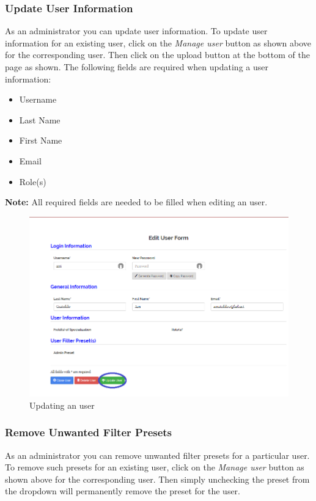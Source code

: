 \documentclass[fontsize=12pt,paper=letter,twoside]{scrartcl}
\begin{document}
\clearpage
\subsubsection{Update User Information}
As an administrator you can update user information. To update user information for an existing user, click on the \emph{Manage user} button as shown above for the corresponding user. Then click on the upload button at the bottom of the page as shown. The following fields are required when updating a user information:
\begin{itemize}
\item Username
\item Last Name
\item First Name
\item Email
\item Role(s)
\end{itemize}

\smallskip
\noindent \textbf{Note:} All required fields are needed to be filled when editing an user.

\begin{figure}[!htb]
\begin{center}
\includegraphics[width=.9\textwidth]{images/adm/mu/update_user.png}
\end{center}
\caption{Updating an user}
\label{fig:adm/update_user}
\end{figure}

\clearpage
\subsubsection{Remove Unwanted Filter Presets}
As an administrator you can remove unwanted filter presets for a particular user. To remove such presets for an existing user, click on the \emph{Manage user} button as shown above for the corresponding user. Then simply unchecking the preset from the dropdown will permanently remove the preset for the user.
\end{document}
